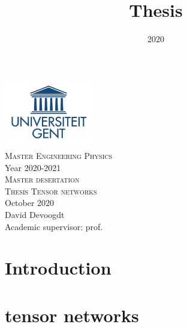 \documentclass{article}
\title{Thesis}
\date{2020}
\begin{document}


\onecolumn
\begin{titlepage}
  \begin{center}

    \includegraphics[width=4cm]{Figuren/UGent.png} \\[0.5cm]    %

    \Large{\textsc{Master Engineering Physics}} \\[0.5cm]  %

    \normalsize{Year 2020-2021} \\[3cm]  %

    \huge{\textsc{Master desertation}} \\[0.25cm]   %

    \Large{\textsc{Thesis Tensor networks}}\\[0.25cm]

    \large \textnormal{October 2020} \\[2.5cm]   %


    David Devoogdt \\       [2.5cm]

    Academic supervisor: prof.

    \vfill

  \end{center}
\end{titlepage}

\tableofcontents

\newpage
\listoftodos
\newpage

{}



\section{Introduction}


\section{tensor networks}

\end{document}
